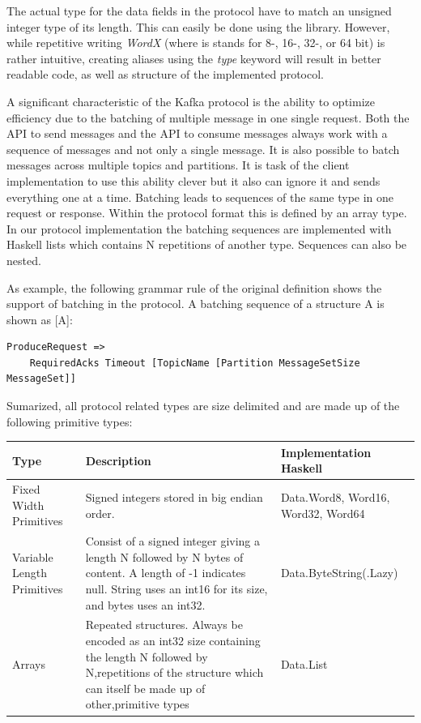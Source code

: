 The actual type for the data fields in the protocol have to match an unsigned
integer type of its length. This can easily be done using the
library. However, while repetitive writing \textit{WordX} (where is stands for
8-, 16-, 32-, or 64 bit) is rather intuitive, creating aliases using the
\textit{type} keyword will result in better readable code, as well as structure
of the implemented protocol. 

A significant characteristic of the Kafka protocol is the ability to optimize
efficiency due to the batching of multiple message in one single request. Both
the API to send messages and the API to consume messages always work with a
sequence of messages and not only a single message. It is also possible to batch
messages across multiple topics and partitions. It is task of the client
implementation to use this ability clever but it also can ignore it and sends everything
one at a time. Batching leads to sequences of the same type in one request or response. Within
the protocol format this is defined by an array type. In our protocol
implementation the batching sequences are implemented with Haskell lists which
contains N repetitions of another type. Sequences can also be nested. 

As example, the following grammar rule of the original definition shows the
support of batching in the protocol. A batching sequence of a structure A is
shown as [A]:
\begin{lstlisting}
ProduceRequest => 
    RequiredAcks Timeout [TopicName [Partition MessageSetSize MessageSet]]
\end{lstlisting}

Sumarized, all protocol related types are size delimited and
are made up of the following primitive types: 
\begin{table}[H]
    \begin{tabular}{| p{3cm}| p{7cm} | l |}
\hline
\textbf{Type} & \textbf{Description} & \textbf{Implementation Haskell} \\ \hline
Fixed Width Primitives     & Signed integers stored in big endian order.
& Data.Word8, Word16, Word32, Word64 \\ \hline
Variable Length Primitives & Consist of a signed integer giving a length N
followed by N bytes of content. A length of -1 indicates null. String uses an
int16 for its size, and bytes uses an int32.        & Data.ByteString(.Lazy)             \\ \hline
Arrays                     & Repeated structures. Always be encoded as an int32
size containing the length N followed by N,repetitions of the structure which
can itself be made up of other,primitive types & Data.List                          \\ \hline
\end{tabular}
\end{table}

